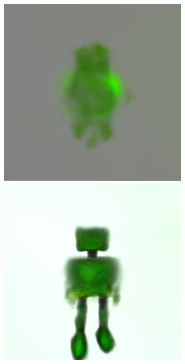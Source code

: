 \begin{figure}[H]
\begin{subfigure}[b]{0.20\textwidth}
        \caption{}
    \end{subfigure}
    \begin{subfigure}[b]{0.20\textwidth}
        \centering
        \includegraphics[width=\textwidth]{etc/a robot made out of plants/dreamfusion/dreamfusion_plantrobot_1_part1.png}
        \includegraphics[width=\textwidth]{etc/a robot made out of plants/dreamfusion/dreamfusion_plantrobot_5000_part1.png}

\end{subfigure}
\end{figure}
